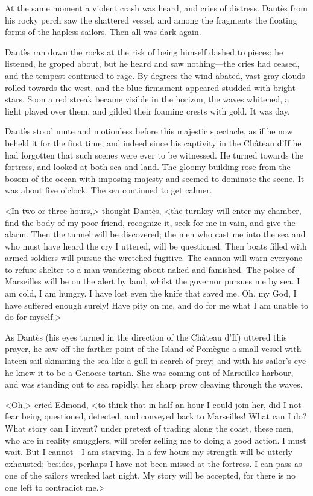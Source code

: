  At the same moment a violent crash was heard, and cries of distress. Dantès from his rocky perch saw the shattered vessel, and among the fragments the floating forms of the hapless sailors. Then all was dark again. 

 Dantès ran down the rocks at the risk of being himself dashed to pieces; he listened, he groped about, but he heard and saw nothing—the cries had ceased, and the tempest continued to rage. By degrees the wind abated, vast gray clouds rolled towards the west, and the blue firmament appeared studded with bright stars. Soon a red streak became visible in the horizon, the waves whitened, a light played over them, and gilded their foaming crests with gold. It was day. 

 Dantès stood mute and motionless before this majestic spectacle, as if he now beheld it for the first time; and indeed since his captivity in the Château d'If he had forgotten that such scenes were ever to be witnessed. He turned towards the fortress, and looked at both sea and land. The gloomy building rose from the bosom of the ocean with imposing majesty and seemed to dominate the scene. It was about five o'clock. The sea continued to get calmer. 

 <In two or three hours,> thought Dantès, <the turnkey will enter my chamber, find the body of my poor friend, recognize it, seek for me in vain, and give the alarm. Then the tunnel will be discovered; the men who cast me into the sea and who must have heard the cry I uttered, will be questioned. Then boats filled with armed soldiers will pursue the wretched fugitive. The cannon will warn everyone to refuse shelter to a man wandering about naked and famished. The police of Marseilles will be on the alert by land, whilst the governor pursues me by sea. I am cold, I am hungry. I have lost even the knife that saved me. Oh, my God, I have suffered enough surely! Have pity on me, and do for me what I am unable to do for myself.> 

 As Dantès (his eyes turned in the direction of the Château d'If) uttered this prayer, he saw off the farther point of the Island of Pomègue a small vessel with lateen sail skimming the sea like a gull in search of prey; and with his sailor's eye he knew it to be a Genoese tartan. She was coming out of Marseilles harbour, and was standing out to sea rapidly, her sharp prow cleaving through the waves. 

 <Oh,> cried Edmond, <to think that in half an hour I could join her, did I not fear being questioned, detected, and conveyed back to Marseilles! What can I do? What story can I invent? under pretext of trading along the coast, these men, who are in reality smugglers, will prefer selling me to doing a good action. I must wait. But I cannot—I am starving. In a few hours my strength will be utterly exhausted; besides, perhaps I have not been missed at the fortress. I can pass as one of the sailors wrecked last night. My story will be accepted, for there is no one left to contradict me.> 

